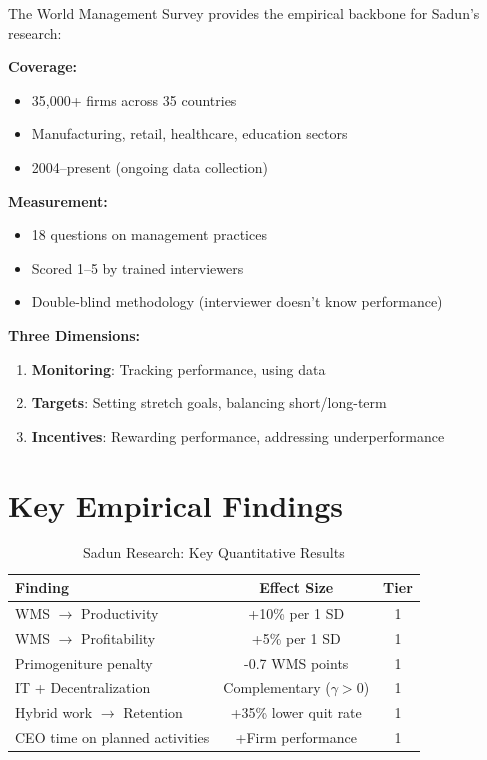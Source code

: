 \begin{tcolorbox}[colback=green!5!white, colframe=green!75!black,
    title=WMS Methodology]

The World Management Survey provides the empirical backbone for Sadun's research:

\textbf{Coverage:}
\begin{itemize}[nosep]
    \item 35,000+ firms across 35 countries
    \item Manufacturing, retail, healthcare, education sectors
    \item 2004--present (ongoing data collection)
\end{itemize}

\textbf{Measurement:}
\begin{itemize}[nosep]
    \item 18 questions on management practices
    \item Scored 1--5 by trained interviewers
    \item Double-blind methodology (interviewer doesn't know performance)
\end{itemize}

\textbf{Three Dimensions:}
\begin{enumerate}[nosep]
    \item \textbf{Monitoring}: Tracking performance, using data
    \item \textbf{Targets}: Setting stretch goals, balancing short/long-term
    \item \textbf{Incentives}: Rewarding performance, addressing underperformance
\end{enumerate}

\end{tcolorbox}

\section{Key Empirical Findings}

\begin{table}[htbp]
\centering
\caption{Sadun Research: Key Quantitative Results}
\label{tab:sadun-results}
\renewcommand{\arraystretch}{1.3}
\small
\begin{tabular}{@{}p{5cm}cc@{}}
\toprule
\textbf{Finding} & \textbf{Effect Size} & \textbf{Tier} \\
\midrule
WMS $\rightarrow$ Productivity & +10\% per 1 SD & 1 \\
WMS $\rightarrow$ Profitability & +5\% per 1 SD & 1 \\
Primogeniture penalty & -0.7 WMS points & 1 \\
IT + Decentralization & Complementary ($\gamma > 0$) & 1 \\
Hybrid work $\rightarrow$ Retention & +35\% lower quit rate & 1 \\
CEO time on planned activities & +Firm performance & 1 \\
\bottomrule
\end{tabular}
\end{table}


